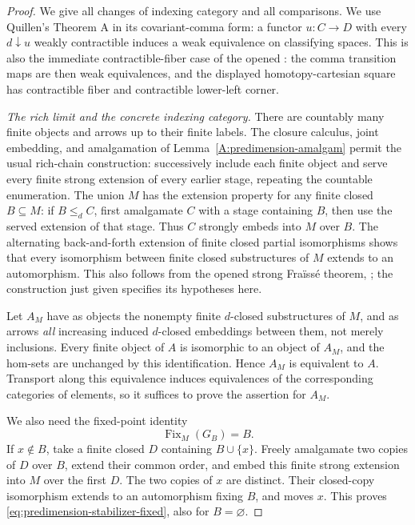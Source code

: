 \begin{proof}
We give all changes of indexing category and all comparisons.
We use Quillen's Theorem A in its covariant-comma form: a functor
$u:C\to D$ with every $d\downarrow u$ weakly contractible induces
a weak equivalence on classifying spaces. This is also the immediate
contractible-fiber case of the opened
\citet[Theorem~IV.5.6]{GoerssJardine2009}: the comma transition maps
are then weak equivalences, and the displayed homotopy-cartesian
square has contractible fiber and contractible lower-left corner.

\emph{The rich limit and the concrete indexing category.}
There are countably many finite objects and arrows up to their finite
labels. The closure calculus, joint embedding, and amalgamation of
Lemma~\ref{A:predimension-amalgam} permit the usual rich-chain
construction: successively include each finite object and serve every
finite strong extension of every earlier stage, repeating the countable
enumeration. The union $M$ has the extension property for any finite
closed $B\subseteq M$: if $B\leq_d C$, first amalgamate $C$ with a
stage containing $B$, then use the served extension of that stage.
Thus $C$ strongly embeds into $M$ over $B$. The alternating
back-and-forth extension of finite closed partial isomorphisms shows
that every isomorphism between finite closed substructures of $M$
extends to an automorphism. This also follows from the opened strong
Fra\"iss\'e theorem, \citet[Theorem~2.6]{EvansHubickaNesetril2019};
the construction just given specifies its hypotheses here.

Let $A_M$ have as objects the nonempty finite $d$-closed
substructures of $M$, and as arrows \emph{all} increasing induced
$d$-closed embeddings between them, not merely inclusions. Every
finite object of $A$ is isomorphic to an object of $A_M$, and the
hom-sets are unchanged by this identification. Hence $A_M$ is
equivalent to $A$. Transport along this equivalence induces
equivalences of the corresponding categories of elements, so it
suffices to prove the assertion for $A_M$.

We also need the fixed-point identity
\[
                       \operatorname{Fix}_M(G_B)=B.
 \tag{F}\label{eq:predimension-stabilizer-fixed}
\]
If $x\notin B$, take a finite closed $D$ containing $B\cup\{x\}$.
Freely amalgamate two copies of $D$ over $B$, extend their common
order, and embed this finite strong extension into $M$ over the first
$D$. The two copies of $x$ are distinct. Their closed-copy
isomorphism extends to an automorphism fixing $B$, and moves $x$.
This proves \eqref{eq:predimension-stabilizer-fixed}, also for
$B=\varnothing$.


\end{proof}
